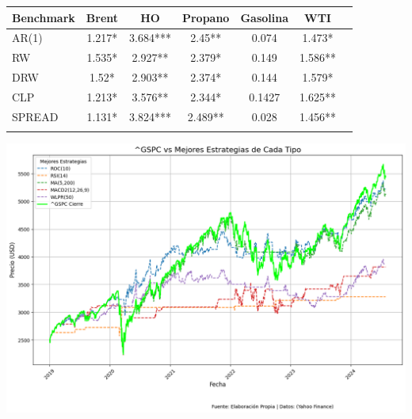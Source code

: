 \documentclass[a0,portrait]{a0poster}
\begin{document}
\begin{multicols}{2}
    \vspace{1cm}
    \begin{minipage}{,984\linewidth}
    \centering
    \begin{tabular}{lcccccc}
        \toprule
        \textbf{Benchmark} & \textbf{Brent} & \textbf{HO} & \textbf{Propano} & \textbf{Gasolina} & \textbf{WTI} \\
        \midrule
        AR(1)     & 1.217*  & 3.684*** & 2.45** & 0.074  & 1.473*  \\
        RW        & 1.535*  & 2.927**  & 2.379* & 0.149  & 1.586** \\
        DRW       & 1.52*   & 2.903**  & 2.374* & 0.144  & 1.579*  \\
        CLP       & 1.213*  & 3.576**  & 2.344* & 0.1427 & 1.625** \\
        SPREAD    & 1.131*  & 3.824*** & 2.489** & 0.028  & 1.456** \\
        \bottomrule
        \vspace{.5cm}
    \end{tabular}
    \end{minipage}
    \begin{minipage}{\linewidth}
    \centering
    \includegraphics[width=0.9\linewidth]{grafico_mejores_estrategias_^GSPC.png}
    

\end{minipage}
\end{multicols}
\end{document}
